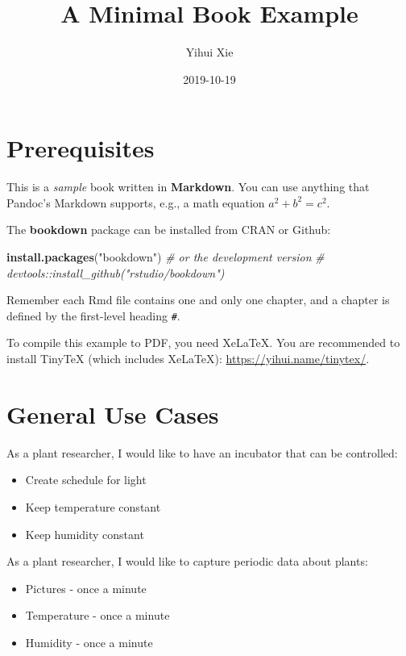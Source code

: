 \documentclass[]{book}
\title{A Minimal Book Example}
\author{Yihui Xie}
\date{2019-10-19}
\newenvironment{Shaded}{\begin{snugshade}}{\end{snugshade}}
\newcommand{\CommentTok}[1]{\textcolor[rgb]{0.56,0.35,0.01}{\textit{#1}}}
\newcommand{\KeywordTok}[1]{\textcolor[rgb]{0.13,0.29,0.53}{\textbf{#1}}}
\newcommand{\NormalTok}[1]{#1}
\newcommand{\StringTok}[1]{\textcolor[rgb]{0.31,0.60,0.02}{#1}}
\begin{document}
\maketitle

{
\setcounter{tocdepth}{1}
\tableofcontents
}
\hypertarget{prerequisites}{%
\chapter{Prerequisites}\label{prerequisites}}

This is a \emph{sample} book written in \textbf{Markdown}. You can use anything that Pandoc's Markdown supports, e.g., a math equation \(a^2 + b^2 = c^2\).

The \textbf{bookdown} package can be installed from CRAN or Github:

\begin{Shaded}
\begin{Highlighting}[]
\KeywordTok{install.packages}\NormalTok{(}\StringTok{"bookdown"}\NormalTok{)}
\CommentTok{# or the development version}
\CommentTok{# devtools::install_github("rstudio/bookdown")}
\end{Highlighting}
\end{Shaded}

Remember each Rmd file contains one and only one chapter, and a chapter is defined by the first-level heading \texttt{\#}.

To compile this example to PDF, you need XeLaTeX. You are recommended to install TinyTeX (which includes XeLaTeX): \url{https://yihui.name/tinytex/}.

\hypertarget{general-use-cases}{%
\chapter{General Use Cases}\label{general-use-cases}}

As a plant researcher, I would like to have an incubator that can be controlled:

\begin{itemize}
\item
  Create schedule for light
\item
  Keep temperature constant
\item
  Keep humidity constant
\end{itemize}

As a plant researcher, I would like to capture periodic data about plants:

\begin{itemize}
\item
  Pictures - once a minute
\item
  Temperature - once a minute
\item
  Humidity - once a minute
\end{itemize}
\end{document}
